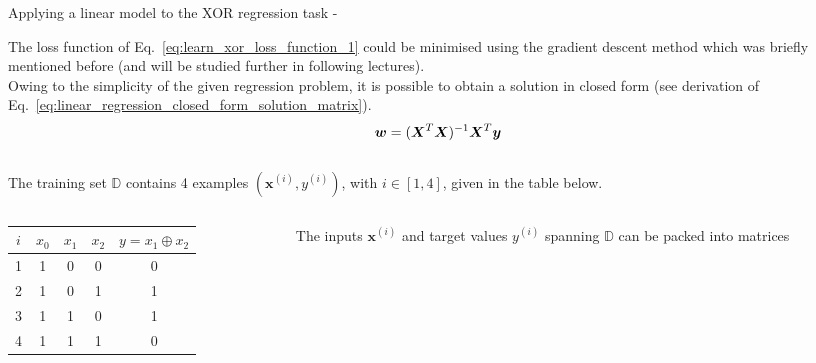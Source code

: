 \begin{frame}[t,allowframebreaks]{Applying a linear model to the XOR regression task -}
    \framebreak


    The \gls{loss function} 
    of Eq.~\ref{eq:learn_xor_loss_function_1} 
    could be minimised using the 
    \gls{gradient descent} 
    method which was briefly mentioned before 
    (and will be studied further in following lectures).\\
    \vspace{0.1cm}
    Owing to the simplicity of the given 
    \gls{regression} problem, 
    it is possible to obtain a solution in closed form 
    (see derivation of Eq.~\ref{eq:linear_regression_closed_form_solution_matrix}).\\
    \vspace{-0.2cm}
    \begin{equation*}
        \boldsymbol{w} = (\boldsymbol{X}^T \boldsymbol{X})^{-1} \boldsymbol{X}^T \boldsymbol{y}
    \end{equation*}\\
    \vspace{0.1cm}
    The training set $\mathbb{D}$ contains 4 examples 
    $(\mathbf{x}^{(i)},y^{(i)})$, with $i \in [1,4]$, given in the table below.\\
    \vspace{0.1cm}
    \begin{columns}[t]
        \begin{column}{0.44\textwidth}
            \vspace{-0.6cm}
            \begin{center}
                \begin{tabular}{ c | c c c | c }
                 $i$ & $x_0$ & $x_1$ & $x_2$ & $y = x_1 \oplus x_2$ \\ 
                 \hline
                 1 & 1 & 0 & 0 & 0 \\  
                 2 & 1 & 0 & 1 & 1 \\   
                 3 & 1 & 1 & 0 & 1 \\  
                 4 & 1 & 1 & 1 & 0 \\   
                \end{tabular}
            \end{center}
        \end{column}
        \begin{column}{0.56\textwidth}
            The inputs $\mathbf{x}^{(i)}$ and target values
            $y^{(i)}$ spanning $\mathbb{D}$ can be packed into matrices

\end{column}
\end{columns}
\end{frame}
